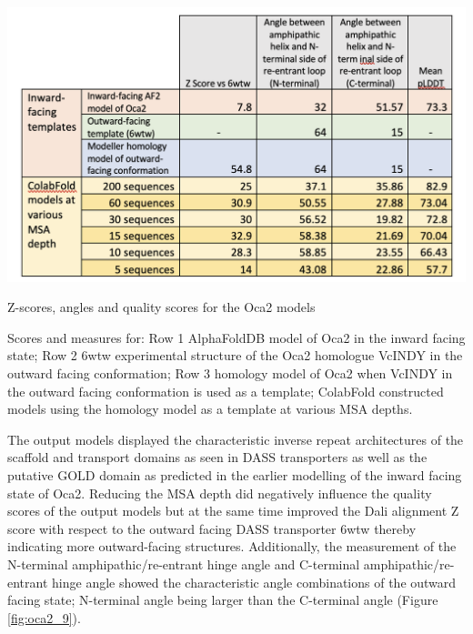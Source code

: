 \begin{table}[th!]
    \centering
    \includegraphics[width=150mm, scale=0.75]{oca2/angle_table.png}
    \caption{Z-scores, angles and quality scores for the Oca2 models}
    \label{table:angles}
    \small
    Scores and measures for: Row 1 AlphaFoldDB model of Oca2 in the inward facing state; Row 2 6wtw experimental structure of the Oca2 homologue VcINDY in the outward facing conformation; Row 3 homology model of Oca2 when VcINDY in the outward facing conformation is used as a template; ColabFold constructed models using the homology model as a template at various MSA depths. 
\end{table}








The output models displayed the characteristic inverse repeat architectures of the scaffold and transport domains as seen in DASS transporters as well as the putative GOLD domain as predicted in the earlier modelling of the inward facing state of Oca2. Reducing the MSA depth did negatively influence the quality scores of the output models but at the same time improved the Dali alignment Z score with respect to the outward facing DASS transporter 6wtw thereby indicating more outward-facing structures. Additionally, the measurement of the N-terminal amphipathic/re-entrant hinge angle and C-terminal amphipathic/re-entrant hinge angle showed the characteristic angle combinations of the outward facing state; N-terminal angle being larger than the C-terminal angle (Figure \ref{fig:oca2_9}).

